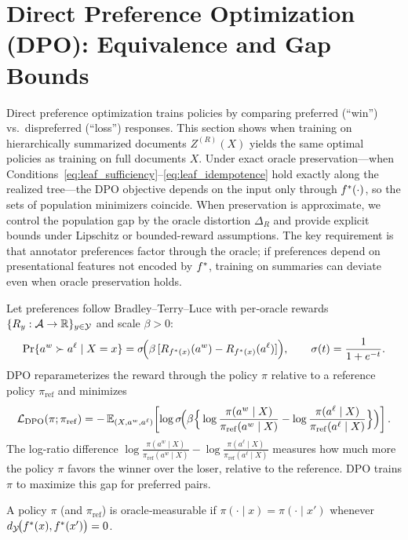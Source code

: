 \section{Direct Preference Optimization (DPO): Equivalence and Gap Bounds}
\label{sec:dpo}

Direct preference optimization trains policies by comparing preferred (``win'') vs.\ dispreferred (``loss'') responses. This section shows when training on hierarchically summarized documents $Z^{(R)}(X)$ yields the same optimal policies as training on full documents $X$. Under exact oracle preservation—when Conditions~\eqref{eq:leaf_sufficiency}--\eqref{eq:leaf_idempotence} hold exactly along the realized tree—the DPO objective depends on the input only through $f^{\ast}(\cdot)$, so the sets of population minimizers coincide. When preservation is approximate, we control the population gap by the oracle distortion $\Delta_R$ and provide explicit bounds under Lipschitz or bounded-reward assumptions. The key requirement is that annotator preferences factor through the oracle; if preferences depend on presentational features not encoded by $f^{\ast}$, training on summaries can deviate even when oracle preservation holds.

Let preferences follow Bradley–Terry–Luce with per‑oracle rewards $\{R_y:\mathcal{A}\to\mathbb{R}\}_{y\in\mathcal{Y}}$ and scale $\beta>0$:
\[
\Pr\{a^w\succ a^\ell\mid X=x\}=\sigma\!\Big(\beta\,[R_{f^{\ast}(x)}(a^w)-R_{f^{\ast}(x)}(a^\ell)]\Big),
\qquad \sigma(t)=\frac{1}{1+e^{-t}}.
\]
DPO reparameterizes the reward through the policy $\pi$ relative to a reference policy $\pi_{\mathrm{ref}}$ and minimizes
\[
\mathcal L_{\mathrm{DPO}}(\pi;\pi_{\mathrm{ref}})=
-\,\mathbb{E}_{(X,a^w,a^\ell)}\!\left[\log \sigma\!\Big(\beta\Big\{\log\frac{\pi(a^w\mid X)}{\pi_{\mathrm{ref}}(a^w\mid X)}-\log\frac{\pi(a^\ell\mid X)}{\pi_{\mathrm{ref}}(a^\ell\mid X)}\Big\}\Big)\right].
\]
The log-ratio difference $\log\frac{\pi(a^w\mid X)}{\pi_{\mathrm{ref}}(a^w\mid X)}-\log\frac{\pi(a^\ell\mid X)}{\pi_{\mathrm{ref}}(a^\ell\mid X)}$ measures how much more the policy $\pi$ favors the winner over the loser, relative to the reference. DPO trains $\pi$ to maximize this gap for preferred pairs.

\begin{definition}
A policy $\pi$ (and $\pi_{\mathrm{ref}}$) is oracle‑measurable if $\pi(\cdot\mid x)=\pi(\cdot\mid x')$ whenever $d_{\mathcal{Y}}\!\big(f^{\ast}(x),f^{\ast}(x')\big)=0$.
\end{definition}

